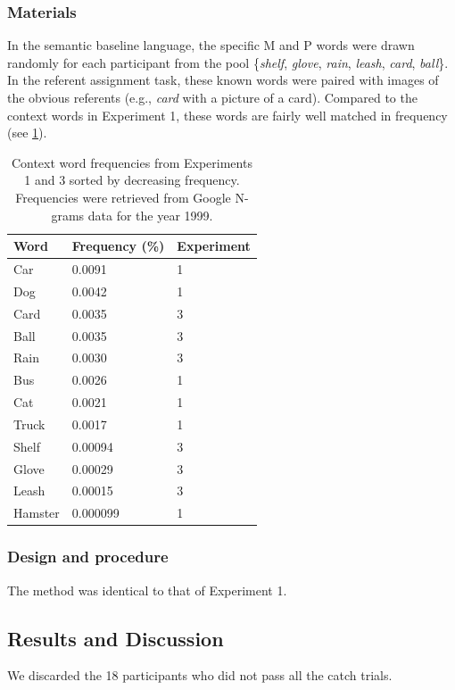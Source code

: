 \documentclass[man,floatsintext]{apa6}
\begin{document}
\subsubsection{Materials}
In the semantic baseline language, the specific M and P words were drawn randomly for each participant from the pool \{\emph{shelf}, \emph{glove}, \emph{rain}, \emph{leash}, \emph{card}, \emph{ball}\}. In the referent assignment task, these known words were paired with images of the obvious referents (e.g., \emph{card} with a picture of a card). Compared to the context words in Experiment 1, these words are fairly well matched in frequency (see \ref{word-freqs}).

\begin{table}
  \begin{center}
  \caption{Context word frequencies from Experiments 1 and 3 sorted by decreasing frequency. Frequencies were retrieved from Google N-grams data for the year 1999.}
  \label{word-freqs}
  \footnotesize{
    \begin{tabular}{l l l}
      Word &  Frequency (\%) & Experiment\\
      \hline
      Car & 0.0091 & 1\\
      Dog & 0.0042 & 1\\
      Card & 0.0035 & 3\\
      Ball & 0.0035 & 3\\
      Rain & 0.0030 & 3\\
      Bus & 0.0026 & 1\\
      Cat & 0.0021 & 1\\
      Truck & 0.0017 & 1\\
      Shelf & 0.00094 & 3\\
      Glove & 0.00029 & 3\\
      Leash & 0.00015 & 3\\
      Hamster & 0.000099 & 1\\
      \hline
    \end{tabular}}
  \end{center}
\end{table}

\subsubsection{Design and procedure}
The method was identical to that of Experiment 1.

\subsection{Results and Discussion}
We discarded the 18 participants who did not pass all the catch trials. 
\end{document}
